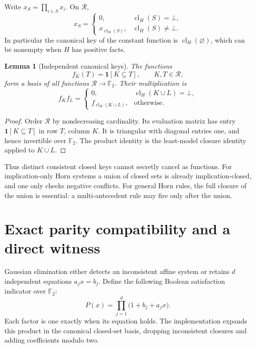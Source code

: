 \documentclass[11pt]{article}
\newtheorem{lemma}[theorem]{Lemma}
\newcommand{\F}{\mathbb F_2}
\newcommand{\cl}{\operatorname{cl}}
\begin{document}
Write \(x_S=\prod_{i\in S}x_i\). On \(\mathcal R\),
\[
 x_S =
 \begin{cases}
 0,&\cl_H(S)=\bot,\\
 x_{\cl_H(S)},&\cl_H(S)\ne\bot.
 \end{cases}
\]
In particular the canonical key of the constant function is
\(\cl_H(\varnothing)\), which can be nonempty when \(H\) has positive facts.

\begin{lemma}[Independent canonical keys]
The functions
\[
 f_K(T)=\mathbf 1[K\subseteq T],
 \qquad K,T\in\mathcal R,
\]
form a basis of all functions \(\mathcal R\to\F\).
Their multiplication is
\[
 f_K f_L =
 \begin{cases}
 0,&\cl_H(K\cup L)=\bot,\\
 f_{\cl_H(K\cup L)},&\text{otherwise}.
 \end{cases}
\]
\end{lemma}
\begin{proof}
Order \(\mathcal R\) by nondecreasing cardinality. Its evaluation matrix
has entry \(\mathbf 1[K\subseteq T]\) in row \(T\), column \(K\).
It is triangular with diagonal entries one, and hence invertible over
\(\F\). The product identity is the least-model closure identity applied
to \(K\cup L\).
\end{proof}

Thus distinct consistent closed keys cannot secretly cancel as functions.
For implication-only Horn systems a union of closed sets is already
implication-closed, and one only checks negative conflicts.
For general Horn rules, the full closure of the union is essential:
a multi-antecedent rule may fire only after the union.

\section{Exact parity compatibility and a direct witness}
Gaussian elimination either detects an inconsistent affine system or
retains \(d\) independent equations \(a_jx=b_j\).
Define the following Boolean satisfaction indicator over \(\F\):
\[
 P(x)=\prod_{j=1}^{d}\bigl(1+b_j+a_jx\bigr).
\]
Each factor is one exactly when its equation holds.
The implementation expands this product in the canonical closed-set
basis, dropping inconsistent closures and adding coefficients modulo two.
\end{document}
